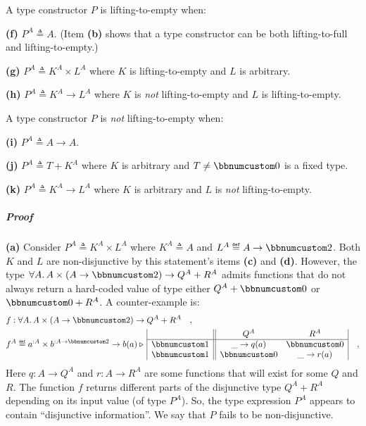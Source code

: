 A type constructor $P$ is lifting-to-empty when:

\textbf{(f)} $P^{A}\triangleq A$. (Item \textbf{(b)} shows that a
type constructor can be both lifting-to-full and lifting-to-empty.)

\textbf{(g)} $P^{A}\triangleq K^{A}\times L^{A}$ where $K$ is lifting-to-empty
and $L$ is arbitrary.

\textbf{(h)} $P^{A}\triangleq K^{A}\rightarrow L^{A}$ where $K$
is \emph{not} lifting-to-empty and $L$ is lifting-to-empty.

A type constructor $P$ is \emph{not} lifting-to-empty when:

\textbf{(i)} $P^{A}\triangleq A\rightarrow A$.

\textbf{(j)} $P^{A}\triangleq T+K^{A}$ where $K$ is arbitrary and
$T\neq\bbnum 0$ is a fixed type.

\textbf{(k)} $P^{A}\triangleq K^{A}\rightarrow L^{A}$ where $K$
is arbitrary and $L$ is \emph{not} lifting-to-empty.

\subparagraph{Proof}

\textbf{(a)} Consider $P^{A}\triangleq K^{A}\times L^{A}$ where $K^{A}\triangleq A$
and $L^{A}\triangleq A\rightarrow\bbnum 2$. Both $K$ and $L$ are
non-disjunctive by this statement\textsf{'}s items \textbf{(c)} and \textbf{(d)}.
However, the type $\forall A.\,A\times(A\rightarrow\bbnum 2)\rightarrow Q^{A}+R^{A}$
admits functions that do not always return a hard-coded value of type
either $Q^{A}+\bbnum 0$ or $\bbnum 0+R^{A}$. A counter-example is:
\begin{align*}
 & f:\forall A.\,A\times(A\rightarrow\bbnum 2)\rightarrow Q^{A}+R^{A}\quad,\\
 & f^{A}\triangleq a^{:A}\times b^{:A\rightarrow\bbnum 2}\rightarrow b(a)\triangleright\,\begin{array}{|c||cc|}
 & Q^{A} & R^{A}\\
\hline \bbnum 1 & \_\rightarrow q(a) & \bbnum 0\\
\bbnum 1 & \bbnum 0 & \_\rightarrow r(a)
\end{array}\quad,
\end{align*}
Here $q:A\rightarrow Q^{A}$ and $r:A\rightarrow R^{A}$ are some
functions that will exist for some $Q$ and $R$. The function $f$
returns different parts of the disjunctive type $Q^{A}+R^{A}$ depending
on its input value (of type $P^{A}$). So, the type expression $P^{A}$
appears to contain \textsf{``}disjunctive information\textsf{''}. We say that $P$
fails to be non-disjunctive.

